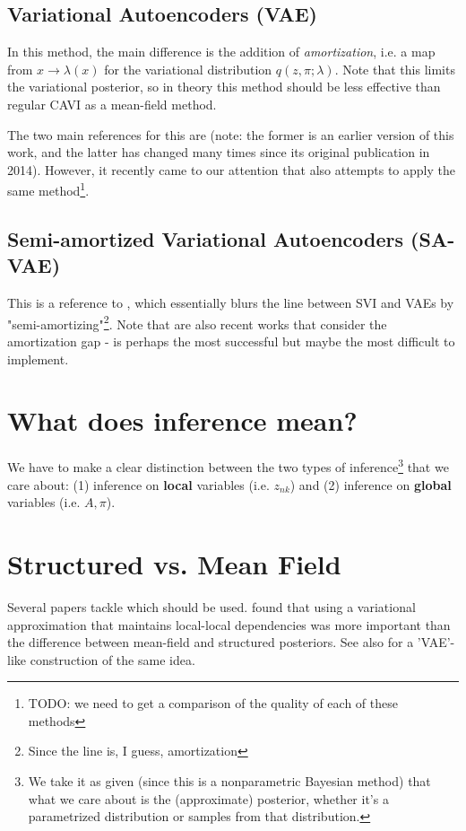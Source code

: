 \documentclass[a4paper, 11pt]{article}
\begin{document}
\subsection{Variational Autoencoders (VAE)}
In this method, the main difference is the addition of \emph{amortization}, i.e. a map from $x \to \lambda(x)$ for the variational distribution $q(z, \pi; \lambda)$. Note that this limits the variational posterior, so in theory this method should be less effective than regular CAVI as a mean-field method.

\medskip

The two main references for this are \citet{singhstructured, chatzis2018indian} (note: the former is an earlier version of this work, and the latter has changed many times since its original publication in 2014). However, it recently came to our attention that \citet{fanscalable} also attempts to apply the same method\footnote{TODO: we need to get a comparison of the quality of each of these methods}.

\subsection{Semi-amortized Variational Autoencoders (SA-VAE)}
This is a reference to \citet{kim2018semi}, which essentially blurs the line between SVI and VAEs by "semi-amortizing"\footnote{Since the line is, I guess, amortization}. Note that \citet{cremer2018inference,krishnan2018challenges,hjelm2016iterative} are also recent works that consider the amortization gap - \citet{kim2018semi} is perhaps the most successful but maybe the most difficult to implement.

\section{What does inference mean?}
We have to make a clear distinction between the two types of inference\footnote{We take it as given (since this is a nonparametric Bayesian method) that what we care about is the (approximate) posterior, whether it's a parametrized distribution or samples from that distribution.} that we care about: (1) inference on \textbf{local} variables (i.e. $z_{nk}$) and (2) inference on \textbf{global} variables (i.e. $A, \pi$).

\section{Structured vs. Mean Field}
Several papers tackle which should be used. \citet{shah2015empirical} found that using a variational approximation that maintains local-local dependencies was more important than the difference between mean-field and structured posteriors. See also \citet{maaloe2016auxiliary} for a 'VAE'-like construction of the same idea.
\end{document}
